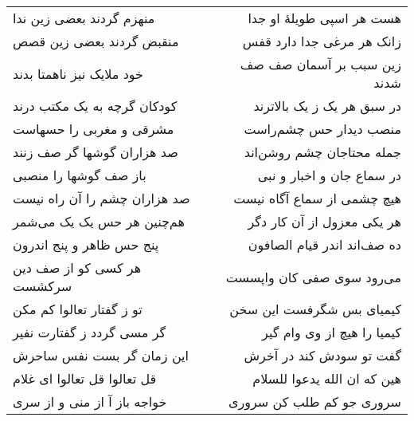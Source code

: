 \begin{center}
\begin{longtable}{l p{0.5cm} r}
منهزم گردند بعضی زین ندا
&&
هست هر اسپی طویلهٔ او جدا
\\
منقبض گردند بعضی زین قصص
&&
زانک هر مرغی جدا دارد قفس
\\
خود ملایک نیز ناهمتا بدند
&&
زین سبب بر آسمان صف صف شدند
\\
کودکان گرچه به یک مکتب درند
&&
در سبق هر یک ز یک بالاترند
\\
مشرقی و مغربی را حسهاست
&&
منصب دیدار حس چشم‌راست
\\
صد هزاران گوشها گر صف زنند
&&
جمله محتاجان چشم روشن‌اند
\\
باز صف گوشها را منصبی
&&
در سماع جان و اخبار و نبی
\\
صد هزاران چشم را آن راه نیست
&&
هیچ چشمی از سماع آگاه نیست
\\
هم‌چنین هر حس یک یک می‌شمر
&&
هر یکی معزول از آن کار دگر
\\
پنج حس ظاهر و پنج اندرون
&&
ده صف‌اند اندر قیام الصافون
\\
هر کسی کو از صف دین سرکشست
&&
می‌رود سوی صفی کان واپسست
\\
تو ز گفتار تعالوا کم مکن
&&
کیمیای بس شگرفست این سخن
\\
گر مسی گردد ز گفتارت نفیر
&&
کیمیا را هیچ از وی وام گیر
\\
این زمان گر بست نفس ساحرش
&&
گفت تو سودش کند در آخرش
\\
قل تعالوا قل تعالوا ای غلام
&&
هین که ان الله یدعوا للسلام
\\
خواجه باز آ از منی و از سری
&&
سروری جو کم طلب کن سروری
\\
\end{longtable}
\end{center}
